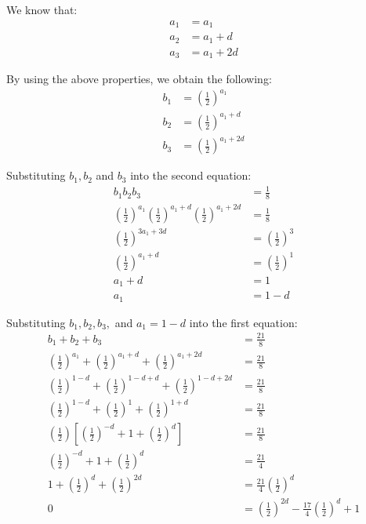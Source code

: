\documentclass[12pt]{article}
\begin{document}
\begin{enumerate}
    We know that:
    \begin{align*}
        a_1 & = a_1 \\
        a_2 & = a_1 + d \\
        a_3 & = a_1 + 2d
    \end{align*}
    
    By using the above properties, we obtain the following:
    \begin{align*}
        b_1 & = (\frac{1}{2})^{a_1} \\
        b_2 & = (\frac{1}{2})^{a_1 + d} \\
        b_3 & = (\frac{1}{2})^{a_1 + 2d}
    \end{align*}
    
    Substituting $b_1, b_2$ and $b_3$ into the second equation:
    \begin{align*}
        b_1b_2b_3 & = \frac{1}{8} \\
        (\frac{1}{2})^{a_1}(\frac{1}{2})^{a_1 + d}(\frac{1}{2})^{a_1 + 2d} & = \frac{1}{8} \\
        (\frac{1}{2})^{3a_1 + 3d} & = (\frac{1}{2})^3 \\
        (\frac{1}{2})^{a_1 + d} & = (\frac{1}{2})^1 \\
        a_1 + d & = 1 \\ 
        a_1 & = 1 - d
    \end{align*}
    
    Substituting $b_1, b_2, b_3,$ and $a_1 = 1- d$ into the first equation:
    \begin{align*}
        b_1 + b_2 + b_3 & = \frac{21}{8} \\
        (\frac{1}{2})^{a_1} + (\frac{1}{2})^{a_1 + d} + (\frac{1}{2})^{a_1 + 2d} & = \frac{21}{8} \\
        (\frac{1}{2})^{1 - d} + (\frac{1}{2})^{1 - d + d} + (\frac{1}{2})^{1 - d + 2d} & = \frac{21}{8} \\
        (\frac{1}{2})^{1 - d} + (\frac{1}{2})^{1} + (\frac{1}{2})^{1 + d} & = \frac{21}{8} \\
        (\frac{1}{2})[(\frac{1}{2})^{-d} + 1 + (\frac{1}{2})^{d}] & = \frac{21}{8} \\
        (\frac{1}{2})^{-d} + 1 + (\frac{1}{2})^{d} & = \frac{21}{4} \\
        1 + (\frac{1}{2})^d + (\frac{1}{2})^{2d} & = \frac{21}{4}(\frac{1}{2})^d \\
        0 & = (\frac{1}{2})^{2d} - \frac{17}{4}(\frac{1}{2})^{d} + 1
    \end{align*} \newpage
    

\end{enumerate}
\end{document}
